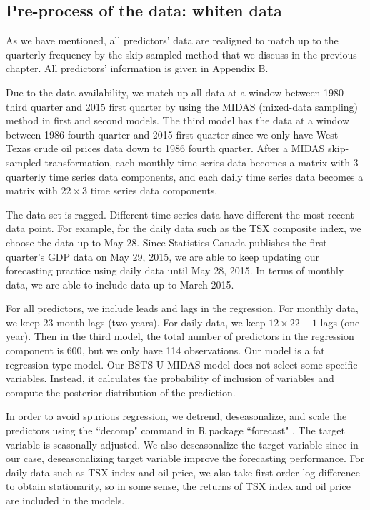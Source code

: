  


\subsection{Pre-process of the data: whiten data}



As we have mentioned, all predictors' data are realigned to match up to the quarterly frequency by the skip-sampled method that we discuss in the previous chapter. All predictors' information is given in  Appendix B. 

Due to the data availability, we match up all data at a window between 1980 third quarter and 2015 first quarter by using the MIDAS (mixed-data sampling) method in first and second models. The third model has the data at a window between 1986 fourth quarter and 2015 first quarter since we only have West Texas crude oil prices data down to 1986 fourth quarter. After a MIDAS skip-sampled transformation, each monthly time series data becomes a matrix with 3 quarterly time series data components, and each daily time series data becomes a matrix with $22 \times 3 $ time series data components.



The data set is ragged. Different time series data have different the most recent data point. For example, for the daily data such as the TSX composite index, we choose the data up to May 28. Since Statistics Canada publishes the first quarter's GDP data on May 29, 2015, we are able to keep updating our forecasting practice using daily data until May 28, 2015. In terms of monthly data, we are able to include data up to March 2015.  

For all predictors, we  include leads and lags in the regression. For  monthly data, we keep 23 month lags (two years). For  daily data, we keep $12 \times 22-1$ lags (one year). Then in the third model, the total number of predictors in the regression component is $600$, but we only have 114 observations. Our model is a fat regression type model. Our BSTS-U-MIDAS model does not select some specific variables. Instead, it calculates the probability of inclusion of variables and compute the posterior distribution of the prediction.

In order to avoid spurious regression, we detrend, deseasonalize, and scale the predictors using the ``decomp" command in R package ``forecast" \cite{Hyndman2015}. The target variable is seasonally adjusted. We also deseasonalize the target variable since in our case, deseasonalizing target variable improve the forecasting performance. For daily data such as TSX index and oil price, we also take first order log difference to obtain stationarity, so in some sense, the returns of TSX index and oil price are included in the models. 

